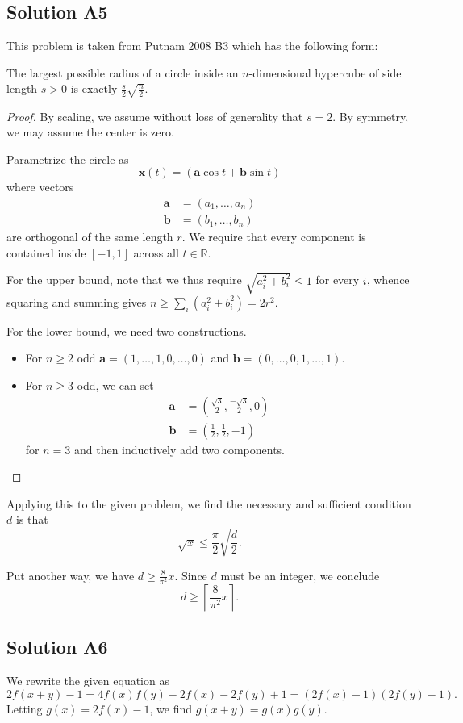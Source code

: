 \documentclass[11pt]{scrartcl}
\providecommand{\half}{\frac{1}{2}}
\providecommand{\RR}{\mathbb R}
\providecommand{\ii}{\item}
\begin{document}
\subsection*{Solution A5}
This problem is taken from Putnam 2008 B3 which has the following form:
\begin{claim*}
	The largest possible radius of a circle inside
	an $n$-dimensional hypercube of side length $s > 0$
	is exactly $\frac s2 \sqrt{\frac n2}$.
\end{claim*}
\begin{proof}
	By scaling, we assume without loss of generality that $s = 2$.
	By symmetry, we may assume the center is zero.

	Parametrize the circle as
	\[ \mathbf x(t)
		= \left( \mathbf a \cos t
		+ \mathbf b \sin t \right) \]
	where vectors 
	\begin{align*}
		\mathbf a &= (a_1, \dots, a_n) \\
		\mathbf b &= (b_1, \dots, b_n)
	\end{align*}
	are orthogonal of the same length $r$.
	We require that every component is contained inside $[-1,1]$
	across all $t \in \RR$.

	For the upper bound, note that we thus require
	$\sqrt{a_i^2+b_i^2} \le 1$ for every $i$,
	whence squaring and summing gives
	$n \ge \sum_i(a_i^2+b_i^2) = 2r^2$.

	For the lower bound, we need two constructions.
	\begin{itemize}
		\ii For $n \ge 2$ odd
		$\mathbf a = (1,\dots,1,0,\dots,0)$
		and $\mathbf b = (0,\dots,0,1,\dots,1)$.
		\ii For $n \ge 3$ odd, we can set
		\begin{align*}
			\mathbf a &= \left( \frac{\sqrt3}{2}, \frac{-\sqrt3}{2}, 0 \right) \\
			\mathbf b &= \left(\half, \half, -1\right)
		\end{align*}
		for $n=3$ and then inductively add two components. \qedhere
	\end{itemize}
\end{proof}
Applying this to the given problem, we find the necessary
and sufficient condition $d$ is that
\[ \sqrt x \le \frac{\pi}{2} \sqrt{\frac{d}{2}}. \]

Put another way, we have $d \ge \frac{8}{\pi^2} x$.
Since $d$ must be an integer, we conclude
\[ d \ge \left\lceil \frac{8}{\pi^2} x \right\rceil. \]

\subsection*{Solution A6}
We rewrite the given equation as
\[ 2f(x+y) - 1 = 4f(x)f(y) - 2f(x) - 2f(y) + 1
	= \left( 2f(x)-1 \right)\left( 2f(y)-1 \right). \]
Letting $g(x) = 2f(x)-1$, we find $g(x+y) = g(x)g(y)$.
\end{document}
